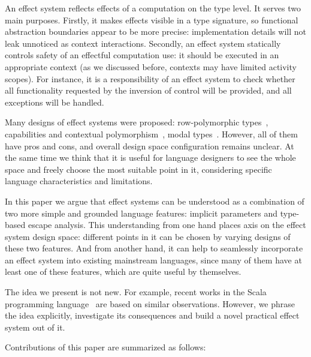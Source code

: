 \documentclass[acmsmall]{acmart}
\begin{document}
An effect system reflects effects of a computation on the type level.
It serves two main purposes.
Firstly, it makes effects visible in a type signature, so functional abstraction boundaries appear to be more precise: implementation details will not leak unnoticed as context interactions.
Secondly, an effect system statically controls safety of an effectful computation use: it should be executed in an appropriate context (as we discussed before, contexts may have limited activity scopes).
For instance, it is a responsibility of an effect system to check whether all functionality requested by the inversion of control will be provided, and all exceptions will be handled.

Many designs of effect systems were proposed: row-polymorphic types~\cite{leijen2014koka}, capabilities and contextual polymorphism~\cite{brachthauser2022effects, boruch2023capturing}, modal types~\cite{tang2024modal}. %
However, all of them have pros and cons, and overall design space configuration remains unclear.
At the same time we think that it is useful for language designers to see the whole space and freely choose the most suitable point in it, considering specific language characteristics and limitations.

In this paper we argue that effect systems can be understood as a combination of two more simple and grounded language features: implicit parameters and type-based escape analysis.
This understanding from one hand places axis on the effect system design space: different points in it can be chosen by varying designs of these two features.
And from another hand, it can help to seamlessly incorporate an effect system into existing mainstream languages, since many of them have at least one of these features, which are quite useful by themselves.

The idea we present is not new.
For example, recent works in the Scala programming language~\cite{boruch2023capturing} are based on similar observations.
However, we phrase the idea explicitly, investigate its consequences and build a novel practical effect system out of it.



Contributions of this paper are summarized as follows:
\end{document}
